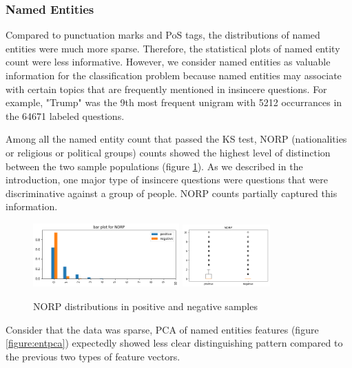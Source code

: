 \documentclass[12pt]{diazessay} %
\begin{document}

\subsubsection{Named Entities} %
\label{ssub:named_entities}

Compared to punctuation marks and PoS tags, the distributions of named entities were much more sparse. Therefore, the statistical plots of named entity count were less informative. However, we consider named entities as valuable information for the classification problem because named entities may associate with certain topics that are frequently mentioned in insincere questions. For example, "Trump" was the 9th most frequent unigram with 5212 occurrances in the 64671 labeled questions. 

Among all the named entity count that passed the KS test, NORP (nationalities or religious or political groups) counts showed the highest level of distinction between the two sample populations (figure \ref{figure:norp}). As we described in the introduction, one major type of insincere questions were questions that were discriminative against a group of people. NORP counts partially captured this information. 

\begin{figure}[!htbp]
    \centering
    \includegraphics[width=0.5\textwidth]{graphs/bar_norp.png}
    \includegraphics[width=0.3\textwidth]{graphs/norp_box.png}
    \caption{NORP distributions in positive and negative samples}
    \label{figure:norp}
\end{figure}

Consider that the data was sparse, PCA of named entities features (figure \ref{figure:entpca}) expectedly showed less clear distinguishing pattern compared to the previous two types of feature vectors. 
\end{document}
